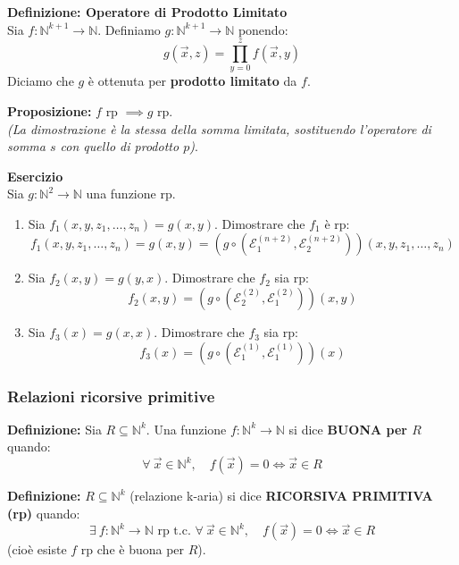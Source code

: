 \vspace{0.4cm}
\textbf{Definizione: Operatore di Prodotto Limitato} \\
Sia $f : \mathbb{N}^{k+1} \to \mathbb{N}$. Definiamo $g : \mathbb{N}^{k+1} \to \mathbb{N}$ ponendo:
$$ g(\vec{x}, z) = \prod_{y=0}^{z} f(\vec{x}, y) $$
Diciamo che $g$ è ottenuta per \textbf{prodotto limitato} da $f$.

\vspace{0.4cm}
\textbf{Proposizione:} $f$ rp $\implies g$ rp. \\
\textit{(La dimostrazione è la stessa della somma limitata, sostituendo l'operatore di somma $s$ con quello di prodotto $p$)}.

\vspace{0.6cm}
\textbf{Esercizio} \\
Sia $g: \mathbb{N}^2 \to \mathbb{N}$ una funzione rp.
\begin{enumerate}
    \item[a)] Sia $f_1(x, y, z_1, \dots, z_n) = g(x, y)$. Dimostrare che $f_1$ è rp:
    $$ f_1(x, y, z_1, \dots, z_n) = g(x, y) = \left( g \circ (\mathcal{E}_1^{(n+2)}, \mathcal{E}_2^{(n+2)}) \right)(x, y, z_1, \dots, z_n) $$
    
    \item[b)] Sia $f_2(x, y) = g(y, x)$. Dimostrare che $f_2$ sia rp:
    $$ f_2(x, y) = \left( g \circ (\mathcal{E}_2^{(2)}, \mathcal{E}_1^{(2)}) \right)(x, y) $$
    
    \item[c)] Sia $f_3(x) = g(x, x)$. Dimostrare che $f_3$ sia rp:
    $$ f_3(x) = \left( g \circ (\mathcal{E}_1^{(1)}, \mathcal{E}_1^{(1)}) \right)(x) $$
\end{enumerate}




\vspace{0.6cm}
\subsubsection{Relazioni ricorsive primitive}

\textbf{Definizione:} Sia $R \subseteq \mathbb{N}^k$. Una funzione $f: \mathbb{N}^k \to \mathbb{N}$ si dice \textbf{BUONA per $R$} quando:
$$ \forall\ \vec{x} \in \mathbb{N}^k, \quad f(\vec{x}) = 0 \iff \vec{x} \in R $$

\vspace{0.4cm}
\textbf{Definizione:} $R \subseteq \mathbb{N}^k$ (relazione k-aria) si dice \textbf{RICORSIVA PRIMITIVA (rp)} quando:
$$ \exists\ f: \mathbb{N}^k \to \mathbb{N} \text{ rp t.c. } \forall\ \vec{x} \in \mathbb{N}^k, \quad f(\vec{x}) = 0 \iff \vec{x} \in R $$
(cioè esiste $f$ rp che è buona per $R$).


